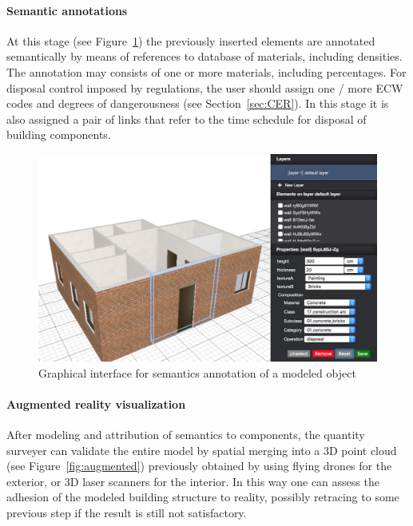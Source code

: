 \documentclass[a4paper,twoside]{article}
\begin{document}
\paragraph{Semantic annotations} 

\noindent
At this stage (see Figure~\ref{fig:semantics}) the previously inserted elements are annotated semantically  by means of references to database of materials, including densities. The annotation may consists of one or more materials, including percentages.
For disposal control imposed by regulations, the user should assign one / more ECW codes and degrees of dangerousness (see Section~\ref{sec:CER}).
In this stage it is also assigned a pair of links that refer to the time schedule for disposal of  building components.

\begin{figure}[!h]
  \centering
  \includegraphics[width=1\linewidth]{images/3d-sel.png}
  \caption{Graphical interface for semantics annotation of a modeled object}
  \label{fig:semantics}
\end{figure}

\paragraph{Augmented reality visualization} 

\noindent
After modeling and attribution of semantics to components, the quantity surveyer can validate the entire model by spatial merging into a 3D point cloud (see Figure~\ref{fig:augmented}) previously obtained by using flying drones for the exterior, or 3D laser scanners for the interior. In this way one can assess the adhesion of the modeled building structure to reality, possibly retracing to some previous step if the result is still not satisfactory.
\end{document}

